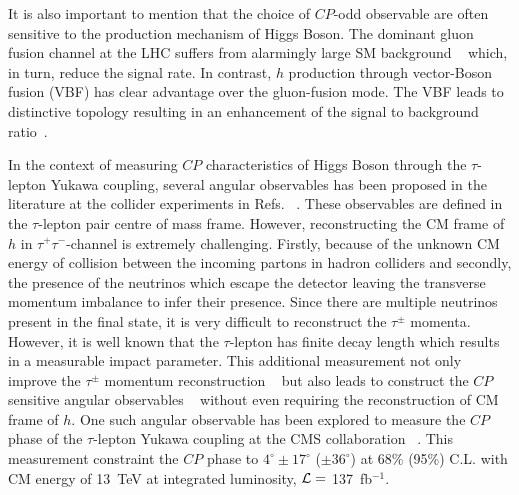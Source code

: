 \documentclass[pdftex,twocolumn,epjc3]{svjour3}          %
\begin{document}
It is also important to mention that the choice of $CP$-odd observable are often sensitive to the  production mechanism of Higgs Boson. The dominant gluon fusion channel at the LHC suffers from alarmingly large SM background   ~\cite{Harnik:2013aja, Dolan:2014upa} which, in turn, reduce the signal rate. In contrast, $h$ production through vector-Boson fusion (VBF) has clear advantage over the gluon-fusion mode. The VBF leads to distinctive topology resulting in an enhancement of the signal to background ratio~\cite{Rainwater:1998kj}.

In the context of measuring $CP$ characteristics of Higgs Boson through the $\tau$-lepton Yukawa coupling, several angular observables has been proposed in the literature at the collider experiments in Refs.   ~\cite{DellAquila:1985jin, DellAquila:1988bko, Bernreuther:1993df, Bernreuther:1993hq, Soni:1993jc, Skjold:1994qn, Grzadkowski:1995rx, Grzadkowski:1999ye, Hagiwara:2000tk, Han:2000mi, Plehn:2001nj, Choi:2002jk, Bower:2002zx, Desch:2003mw, Asakawa:2003dh, Desch:2003rw, Godbole:2004xe, Rouge:2005iy, Biswal:2005fh, Ellis:2005ika, Godbole:2007cn, BhupalDev:2007ftb, Berge:2008wi, Berge:2008dr, DeRujula:2010ys, Christensen:2010pf, Berge:2011ij, Godbole:2011hw, Harnik:2013aja, Berge:2013jra, Chen:2014ona, Dolan:2014upa, Hayreter:2015cia, Han:2016bvf, Bhardwaj:2016lcu, Swain:2020sil}. These observables are defined in the $\tau$-lepton pair centre of mass frame. However, reconstructing the CM frame of $h$ in $\tau^+\tau^-$-channel is extremely challenging. Firstly, because of the unknown CM energy of collision between the incoming partons in hadron colliders and secondly, the presence of the neutrinos which escape the detector leaving the transverse momentum imbalance to infer their presence. Since there are multiple neutrinos present in the final state, it is very difficult to reconstruct the $\tau^\pm$ momenta. However, it is well known that the $\tau$-lepton has finite decay length which results in a measurable impact parameter. This additional measurement not only improve the $\tau^\pm$ momentum reconstruction   ~\cite{Hagiwara:2016zqz, Bhardwaj:2016lcu} but also leads to construct the $CP$ sensitive angular observables   ~\cite{Berge:2008dr, Berge:2014sra} without even requiring the reconstruction of CM frame of $h$. One such angular observable has been explored to measure the $CP$ phase of the $\tau$-lepton Yukawa coupling at the CMS collaboration   ~\cite{CMS:2020rpr}. This measurement constraint the $CP$ phase to $4^\circ \pm 17^\circ$ ($\pm 36^\circ$)  at 68\% (95\%) C.L. with CM energy of 13~TeV at integrated luminosity, $\cal{L} =$  137~fb$^{-1}$. 
\end{document}
